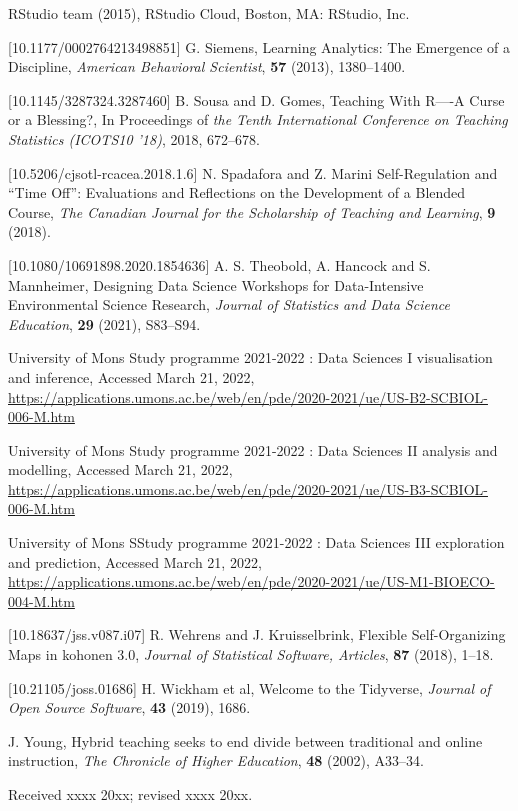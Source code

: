 \documentclass{aims}
\theoremstyle{definition}
\begin{document}
\begin{thebibliography}{99}
     \newblock RStudio team (2015),
     \newblock RStudio Cloud,
     \newblock Boston, MA: RStudio, Inc.

 [10.1177/0002764213498851]
     \newblock G. Siemens,
     \newblock Learning Analytics: The Emergence of a Discipline,
     \newblock \emph{American Behavioral Scientist}, \textbf{57} (2013), 1380--1400.

 [10.1145/3287324.3287460]
     \newblock B. Sousa and D. Gomes,
     \newblock Teaching With R—-A Curse or a Blessing?,
     \newblock In Proceedings of \emph{the Tenth International Conference on Teaching Statistics (ICOTS10 '18)}, 2018, 672–678.

 [10.5206/cjsotl-rcacea.2018.1.6]
     \newblock N. Spadafora and Z. Marini
     \newblock Self-Regulation and “Time Off”: Evaluations and Reflections on the Development of a Blended Course,
     \newblock \emph{The Canadian Journal for the Scholarship of Teaching and Learning}, \textbf{9} (2018).

 [10.1080/10691898.2020.1854636]
     \newblock A. S. Theobold, A. Hancock and S. Mannheimer,
     \newblock  Designing Data Science Workshops for Data-Intensive Environmental Science Research,
     \newblock \emph{Journal of Statistics and Data Science Education}, \textbf{29} (2021), S83--S94.

    \newblock University of Mons
    \newblock Study programme 2021-2022 : Data Sciences I visualisation and inference,
    \newblock Accessed March 21, 2022,
    \newblock \url{https://applications.umons.ac.be/web/en/pde/2020-2021/ue/US-B2-SCBIOL-006-M.htm}

    \newblock University of Mons
    \newblock Study programme 2021-2022 : Data Sciences II analysis and modelling,
    \newblock Accessed March 21, 2022,
    \newblock \url{https://applications.umons.ac.be/web/en/pde/2020-2021/ue/US-B3-SCBIOL-006-M.htm}

    \newblock University of Mons
    \newblock SStudy programme 2021-2022 : Data {Sciences} {III} exploration and prediction,
    \newblock Accessed March 21, 2022,
    \newblock \url{https://applications.umons.ac.be/web/en/pde/2020-2021/ue/US-M1-BIOECO-004-M.htm}

 [10.18637/jss.v087.i07]
     \newblock R. Wehrens and J. Kruisselbrink,
     \newblock  Flexible Self-Organizing Maps in kohonen 3.0,
     \newblock \emph{Journal of Statistical Software, Articles}, \textbf{87} (2018), 1--18.

 [10.21105/joss.01686]
     \newblock H. Wickham et al,
     \newblock  Welcome to the Tidyverse,
     \newblock \emph{Journal of Open Source Software}, \textbf{43} (2019), 1686.

     \newblock  J. Young,
     \newblock Hybrid teaching seeks to end divide between traditional and online instruction,
     \newblock \emph{The Chronicle of Higher Education}, \textbf{48} (2002), A33--34.

\end{thebibliography}

\medskip
Received xxxx 20xx; revised xxxx 20xx.
\medskip
\end{document}
